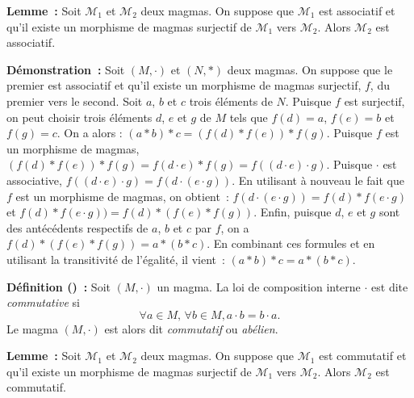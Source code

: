 \medskip

\noindent\textbf{Lemme :} Soit $\mathcal{M}_1$ et $\mathcal{M}_2$ deux magmas.
    On suppose que $\mathcal{M}_1$ est associatif et qu'il existe un morphisme de magmas surjectif de $\mathcal{M}_1$ vers $\mathcal{M}_2$.
    Alors $\mathcal{M}_2$ est associatif.

\medskip

\noindent\textbf{Démonstration :} Soit $(M,\cdot)$ et $(N,\ast)$ deux magmas. 
    On suppose que le premier est associatif et qu'il existe un morphisme de magmas surjectif, $f$, du premier vers le second. 
    Soit $a$, $b$ et $c$ trois éléments de $N$. 
    Puisque $f$ est surjectif, on peut choisir trois éléments $d$, $e$ et $g$ de $M$ tels que $f(d) = a$, $f(e) = b$ et $f(g) = c$.
    On a alors : $(a \ast b) \ast c = (f(d) \ast f(e)) \ast f(g)$.
    Puisque $f$ est un morphisme de magmas, $(f(d) \ast f(e)) \ast f(g) = f(d \cdot e) \ast f(g) = f((d \cdot e) \cdot g)$.
    Puisque $\cdot$ est associative, $f((d \cdot e) \cdot g) = f(d \cdot (e \cdot g))$. 
    En utilisant à nouveau le fait que $f$ est un morphisme de magmas, on obtient : $f(d \cdot (e \cdot g)) = f(d) \ast f(e \cdot g)$ et $f(d) \ast f(e \cdot g)) = f(d) \ast (f(e) \ast f(g))$. 
    Enfin, puisque $d$, $e$ et $g$ sont des antécédents respectifs de $a$, $b$ et $c$ par $f$, on a $f(d) \ast (f(e) \ast f(g)) = a \ast (b \ast c)$. 
    En combinant ces formules et en utilisant la transitivité de l'égalité, il vient : $(a \ast b) \ast c = a \ast (b \ast c)$.

    \hfill \square

\medskip

\noindent\textbf{Définition () :} Soit $(M,\cdot)$ un magma.
    La loi de composition interne $\cdot$ est dite \textit{commutative} si
    \begin{equation*}
        \forall a \in M, \, \forall b \in M,  
        a \cdot b = b \cdot a.
    \end{equation*}
    Le magma $(M, \cdot)$ est alors dit \textit{commutatif} ou \textit{abélien}.

\medskip

\noindent\textbf{Lemme :} Soit $\mathcal{M}_1$ et $\mathcal{M}_2$ deux magmas.
    On suppose que $\mathcal{M}_1$ est commutatif et qu'il existe un morphisme de magmas surjectif de $\mathcal{M}_1$ vers $\mathcal{M}_2$.
    Alors $\mathcal{M}_2$ est commutatif.

\medskip

